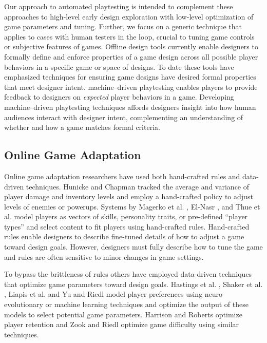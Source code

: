 \documentclass{sig-alternate}
\begin{document}
Our approach to automated playtesting is intended to complement these approaches to high-level early design exploration with low-level optimization of game parameters and tuning.
Further, we focus on a generic technique that applies to cases with human testers in the loop, crucial to tuning game controls or subjective features of games.
%
Offline design tools currently enable designers to formally define and enforce properties of a game design across all possible player behaviors in a specific game or space of designs.
To date these tools have emphasized techniques for ensuring game designs have desired formal properties that meet designer intent.
%
machine--driven playtesting enables players to provide feedback to designers on \textit{expected} player behaviors in a game.
Developing machine--driven playtesting techniques affords designers insight into how human audiences interact with designer intent, complementing an understanding of whether and how a game matches formal criteria.




\subsection{Online Game Adaptation}
Online game adaptation researchers have used both hand-crafted rules and data-driven techniques.
Hunicke and Chapman \cite{hunicke2004:dda} tracked the average and variance of player damage and inventory levels and employ a hand-crafted policy to adjust levels of enemies or powerups. 
Systems by Magerko et al. \cite{magerko2006:isat}, El-Nasr \cite{seifel-nasr2007:mirage}, and Thue et al. \cite{thue2007:storytell-pm} model players as vectors of skills, personality traits, or pre-defined ``player types'' and select content to fit players using hand-crafted rules. %
Hand-crafted rules enable designers to describe fine-tuned details of how to adjust a game toward design goals.
However, designers must fully describe how to tune the game and rules are often sensitive to minor changes in game settings.

To bypass the brittleness of rules others have employed data-driven techniques that optimize game parameters toward design goals.
Hastings et al. \cite{hastings2009:gar}, Shaker et al. \cite{shaker2013:crowdsource-platform-aesthetics}, Liapis et al. \cite{liapis2013:rank-based-interactive-evol} and Yu and Riedl \cite{yu2013:storyeti} model player preferences using neuro-evolutionary or machine learning techniques and optimize the output of these models to select potential game parameters.
Harrison and Roberts \cite{harrison2013:scrabble-retention} optimize player retention and Zook and Riedl \cite{zook2012:tf} optimize game difficulty using similar techniques.
\end{document}
